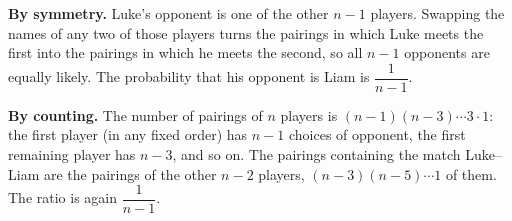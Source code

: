 \textbf{By symmetry.} Luke's opponent is one of the other $n-1$ players. Swapping the names of any two of those players turns the pairings in which Luke meets the first into the pairings in which he meets the second, so all $n-1$ opponents are equally likely. The probability that his opponent is Liam is $\boxed{\dfrac{1}{n-1}}$.

\textbf{By counting.} The number of pairings of $n$ players is $(n-1)(n-3)\cdots3\cdot1$: the first player (in any fixed order) has $n-1$ choices of opponent, the first remaining player has $n-3$, and so on. The pairings containing the match Luke--Liam are the pairings of the other $n-2$ players, $(n-3)(n-5)\cdots1$ of them. The ratio is again $\dfrac{1}{n-1}$.
